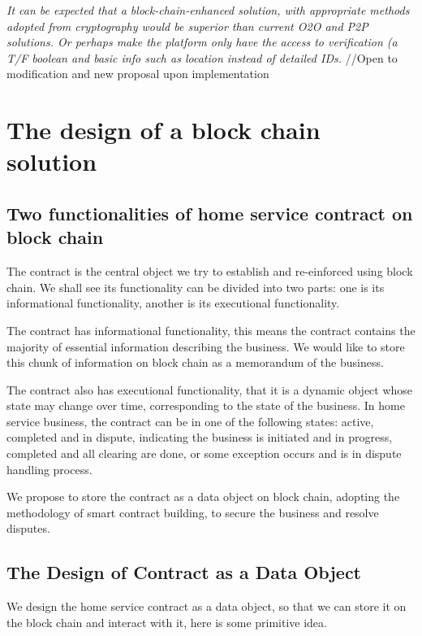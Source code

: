 \documentclass[]{scrartcl}
\begin{document}
\textit{It can be expected that a block-chain-enhanced solution, with appropriate methods adopted from cryptography would be superior than current O2O and P2P solutions. Or perhaps make the platform only have the access to verification (a T/F boolean and basic info such as location instead of detailed IDs.
}
//Open to modification and new proposal upon implementation



\section{The design of a block chain solution}

\subsection{Two functionalities of home service contract on block chain}

The contract is the central object we try to establish and re-einforced using block chain.
We shall see its functionality can be divided into two parts: one is its informational functionality, another is its executional functionality.

The contract has informational functionality, this means the contract contains the majority of essential information describing the business. We would like to store this chunk of information on block chain as a memorandum of the business. 

The contract also has executional functionality, that it is a dynamic object whose state may change over time, corresponding to the state of the business. In home service business, the contract can be in one of the following states: active, completed and in dispute, indicating the business is initiated and in progress, completed and all clearing are done, or some exception occurs and is in dispute handling process.

We propose to store the contract as a data object on block chain, adopting the methodology of smart contract building, to secure the business and resolve disputes.

\subsection{The Design of Contract as a Data Object}

We design the home service contract as a data object, so that we can store it on the block chain and interact with it, here is some primitive idea.
\end{document}
